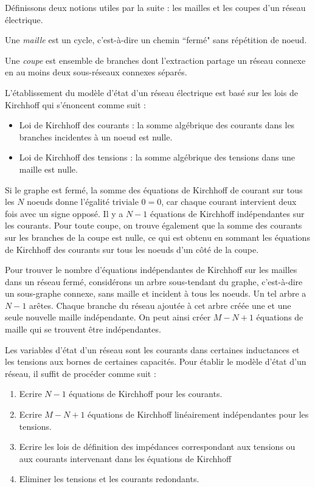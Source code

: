 Définissons deux notions utiles par la suite : les
mailles et les coupes d'un réseau électrique.
\begin{description}
\item Une {\em maille} est un cycle, c'est-à-dire un chemin ``fermé" sans répétition de noeud.
\item Une {\em coupe} est ensemble  de branches dont
l'extraction partage un réseau connexe en au moins deux sous-réseaux connexes séparés.
\end{description}

L'établissement du modèle d'état d'un réseau électrique est
basé sur les lois de Kirchhoff qui s'énoncent comme suit :
\begin{itemize}
\item Loi de Kirchhoff des courants : la somme algébrique des
courants dans les branches incidentes à un noeud est nulle.
\item Loi de Kirchhoff des tensions : la somme algébrique des
tensions dans une maille est nulle.
\end{itemize}


Si le graphe est fermé, la somme des équations de Kirchhoff de courant sur tous les $N$ noeuds donne l'égalité triviale $0=0$, car chaque courant intervient deux fois avec un signe opposé. Il y a $N-1$ équations de Kirchhoff indépendantes sur les courants. Pour toute coupe, on trouve également que la somme des courants sur les branches de la coupe est nulle, ce qui est obtenu en sommant les équations de Kirchhoff des courants sur tous les noeuds d'un côté de la coupe.

Pour trouver le nombre d'équations indépendantes de Kirchhoff sur les mailles dans un réseau fermé, considérons un arbre sous-tendant du graphe, c'est-à-dire un sous-graphe connexe, sans maille et incident à tous les noeuds. Un tel arbre a $N-1$ arêtes. Chaque branche du réseau ajoutée à cet arbre  créée une et une seule nouvelle maille indépendante. On peut ainsi créer $M-N+1$ équations de maille qui se trouvent être indépendantes.


Les variables d'état d'un réseau sont les courants dans
certaines inductances et les tensions aux bornes de certaines
capacités.   Pour établir le modèle d'état d'un réseau, il suffit
de procéder comme suit :
\begin{enumerate}
\item Ecrire $N-1$ équations de Kirchhoff  pour les courants.
\item Ecrire $M-N+1$ équations de Kirchhoff linéairement
indépendan\-tes pour les tensions.
\item Ecrire les lois de définition des impédances correspondant
aux  tensions ou aux courants intervenant dans les équations de
Kirchhoff 
\item Eliminer les tensions et les courants redondants.
\end{enumerate}


